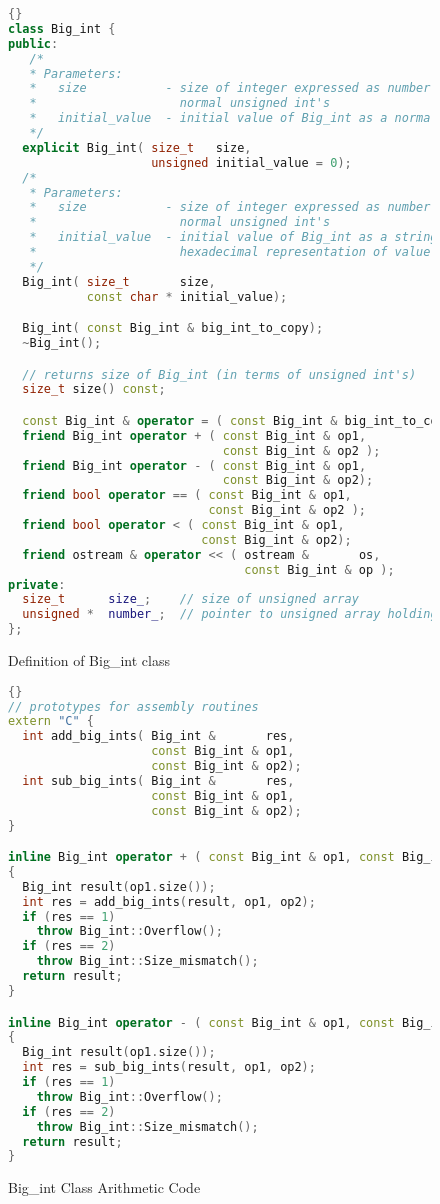 \begin{figure}[tp]
\begin{lstlisting}[frame=tlrb,language=C++]{}
class Big_int {
public:
   /* 
   * Parameters:
   *   size           - size of integer expressed as number of 
   *                    normal unsigned int's
   *   initial_value  - initial value of Big_int as a normal unsigned int
   */
  explicit Big_int( size_t   size,
                    unsigned initial_value = 0);
  /*
   * Parameters:
   *   size           - size of integer expressed as number of 
   *                    normal unsigned int's
   *   initial_value  - initial value of Big_int as a string holding
   *                    hexadecimal representation of value. 
   */
  Big_int( size_t       size,
           const char * initial_value);

  Big_int( const Big_int & big_int_to_copy);
  ~Big_int();

  // returns size of Big_int (in terms of unsigned int's)
  size_t size() const;

  const Big_int & operator = ( const Big_int & big_int_to_copy);
  friend Big_int operator + ( const Big_int & op1,
                              const Big_int & op2 );
  friend Big_int operator - ( const Big_int & op1,
                              const Big_int & op2);
  friend bool operator == ( const Big_int & op1,
                            const Big_int & op2 );
  friend bool operator < ( const Big_int & op1,
                           const Big_int & op2);
  friend ostream & operator << ( ostream &       os,
                                 const Big_int & op );
private:
  size_t      size_;    // size of unsigned array
  unsigned *  number_;  // pointer to unsigned array holding value
};
\end{lstlisting}
\caption{Definition of Big\_int class\label{fig:BigIntClass}}
\end{figure}

\begin{figure}[tp]
\begin{lstlisting}[frame=tlrb,language=C++]{}
// prototypes for assembly routines
extern "C" {
  int add_big_ints( Big_int &       res, 
                    const Big_int & op1, 
                    const Big_int & op2);
  int sub_big_ints( Big_int &       res, 
                    const Big_int & op1, 
                    const Big_int & op2);
}

inline Big_int operator + ( const Big_int & op1, const Big_int & op2)
{
  Big_int result(op1.size());
  int res = add_big_ints(result, op1, op2);
  if (res == 1)
    throw Big_int::Overflow();
  if (res == 2)
    throw Big_int::Size_mismatch();
  return result;
}

inline Big_int operator - ( const Big_int & op1, const Big_int & op2)
{
  Big_int result(op1.size());
  int res = sub_big_ints(result, op1, op2);
  if (res == 1)
    throw Big_int::Overflow();
  if (res == 2)
    throw Big_int::Size_mismatch();
  return result;
}
\end{lstlisting}
\caption{Big\_int Class Arithmetic Code\label{fig:BigIntAdd}}
\end{figure}

